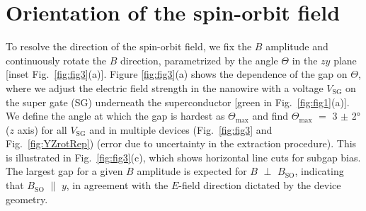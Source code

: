 \section{Orientation of the spin-orbit field}
To resolve the direction of the spin-orbit field, we fix the $B$ amplitude and continuously rotate the $B$ direction, parametrized by the angle $\Theta$ in the $zy$ plane [inset Fig.~\ref{fig:fig3}(a)].
Figure \ref{fig:fig3}(a) shows the dependence of the gap on $\Theta$, where we adjust the electric field strength in the nanowire with a voltage $V_{\mathrm{SG}}$ on the super gate (SG) underneath the superconductor [green in Fig.~\ref{fig:fig1}(a)].
We define the angle at which the gap is hardest as $\Theta_{\mathrm{max}}$ and find $\Theta_{\mathrm{max}}$ $=$ 3 $\pm$ \ang{2} ($z$ axis) for all $V_{\mathrm{SG}}$ and in multiple devices (Fig.~\ref{fig:fig3} and Fig.~\ref{fig:YZrotRep}) (error due to uncertainty in the extraction procedure).
This is illustrated in Fig.~\ref{fig:fig3}(c), which shows horizontal line cuts for subgap bias.
The largest gap for a given $B$ amplitude is expected for $B$ $\perp$ $B_{\mathrm{SO}}$, indicating that $B_{\mathrm{SO}}$ $\parallel$ $y$, in agreement with the $E$-field direction dictated by the device geometry.

